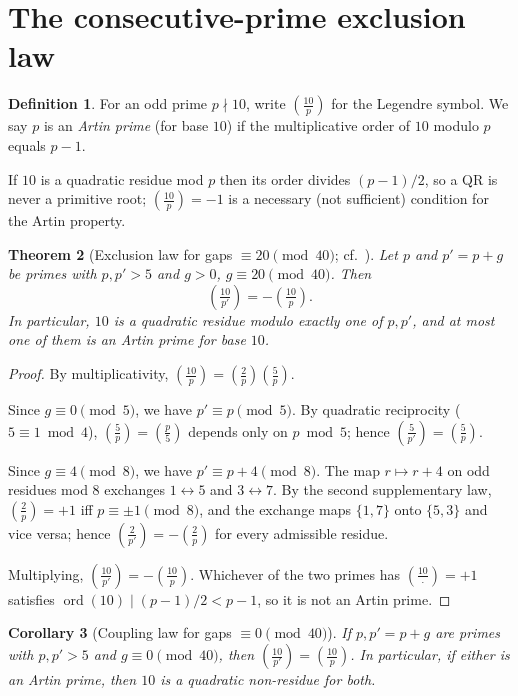 \documentclass[11pt,reqno]{amsart}
\theoremstyle{plain}
\newtheorem{theorem}{Theorem}
\newtheorem{corollary}[theorem]{Corollary}
\theoremstyle{definition}
\newtheorem{definition}[theorem]{Definition}
\newcommand{\Lsym}[2]{\left(\tfrac{#1}{#2}\right)}
\begin{document}
\section{The consecutive-prime exclusion law}
\label{sec:theorem}

\begin{definition}
	For an odd prime $p \nmid 10$, write $\Lsym{10}{p}$ for the Legendre symbol.
	We say $p$ is an \emph{Artin prime} (for base $10$) if the multiplicative order
	of $10$ modulo $p$ equals $p - 1$.
\end{definition}

If $10$ is a quadratic residue mod $p$ then its order divides $(p-1)/2$, so a
QR is never a primitive root; $\Lsym{10}{p} = -1$ is a necessary (not
sufficient) condition for the Artin property.

\begin{theorem}[Exclusion law for gaps $\equiv 20 \pmod{40}$; cf.\ {\rm\cite[Thm.~1.1]{TinkovaWaxmanZindulka2023}}]
	\label{thm:exclusion}
	Let $p$ and $p' = p + g$ be primes with $p, p' > 5$ and $g > 0$,
	$g \equiv 20 \pmod{40}$.
	Then
	\[
		\Lsym{10}{p'} = -\Lsym{10}{p}.
	\]
	In particular, $10$ is a quadratic residue modulo exactly one of $p, p'$, and
	at most one of them is an Artin prime for base $10$.
\end{theorem}

\begin{proof}
	By multiplicativity, $\Lsym{10}{p} = \Lsym{2}{p}\Lsym{5}{p}$.

	Since $g \equiv 0 \pmod 5$, we have $p' \equiv p \pmod 5$. By quadratic
	reciprocity ($5 \equiv 1 \bmod 4$), $\Lsym{5}{p} = \Lsym{p}{5}$ depends only on
	$p \bmod 5$; hence $\Lsym{5}{p'} = \Lsym{5}{p}$.

	Since $g \equiv 4 \pmod 8$, we have $p' \equiv p + 4 \pmod 8$. The map
	$r \mapsto r + 4$ on odd residues mod $8$ exchanges $1 \leftrightarrow 5$ and
	$3 \leftrightarrow 7$. By the second supplementary law,
	$\Lsym{2}{p} = +1$ iff $p \equiv \pm 1 \pmod 8$, and the exchange maps
	$\{1, 7\}$ onto $\{5, 3\}$ and vice versa; hence $\Lsym{2}{p'} = -\Lsym{2}{p}$
	for every admissible residue.

	Multiplying, $\Lsym{10}{p'} = -\Lsym{10}{p}$. Whichever of the two primes has
	$\Lsym{10}{\cdot} = +1$ satisfies $\operatorname{ord}(10) \mid (p-1)/2 < p-1$, so it
	is not an Artin prime.
\end{proof}

\begin{corollary}[Coupling law for gaps $\equiv 0 \pmod{40}$]
	\label{cor:coupling}
	If $p, p' = p + g$ are primes with $p, p' > 5$ and $g \equiv 0 \pmod{40}$, then
	$\Lsym{10}{p'} = \Lsym{10}{p}$. In particular, if either is an Artin prime,
	then $10$ is a quadratic non-residue for both.
\end{corollary}
\end{document}
